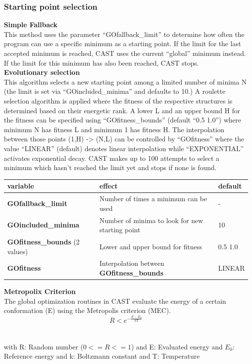 \documentclass[10pt,a4paper]{article} %
\begin{document}
	\subsubsection{Starting point selection}
	\textbf{Simple Fallback} \\
	This method uses the parameter ``GOfallback\_limit'' to determine how often the program can use a specific minimum as a starting point. If the limit for the last accepted minimum is reached, \ac{CAST} uses the current ``global'' minimum instead. If the limit for this minimum has also been reached, \ac{CAST} stops.\\
		
	\textbf{Evolutionary selection} \\
	This algorithm selects a new starting point among a limited number of minima N (the limit is set via ``GOincluded\_minima'' and defaults to 10.)
	A roulette selection algorithm is applied where the fitness of the respective structures is determined based on their energetic rank. A lower L and an upper bound H for the fitness can be specified using ``GOfitness\_bounds'' (default ``0.5 1.0'') where minimum N has fitness L and minimum 1 has fitness H.
	The interpolation between those points (1,H) -> (N,L) can be controlled by ``GOfitness'' where the value ``LINEAR'' (default) denotes linear interpolation while ``EXPONENTIAL'' activates exponential decay.
	\ac{CAST} makes up to 100 attempts to select a minimum which hasn't reached the limit yet and stops if none is found.
	
	\begin{longtable}{|p{3.5cm}|p{5cm}|p{2.5cm}|}
	variable & effect & default \\
		\hline
		\textbf{GOfallback\_limit} & Number of times a minimum can be used & - \\
		\textbf{GOincluded\_minima} & Number of minima to look for new starting point & 10 \\
		\textbf{GOfitness\_bounds} (2 values) & Lower and upper bound for fitness & 0.5 1.0 \\
		\textbf{GOfitness} & Interpolation between \textbf{GOfitness\_bounds} & LINEAR \\
	\end{longtable}

	\textbf{Metropolix Criterion} \\
	The global optimization routines in \ac{CAST} evaluate the energy of a certain conformation (E) using the Metropolis criterion (MEC).
	\begin{equation}
	R < e^{-\frac{E-E_0}{kT}}
	\end{equation}
	\\~\\
	with R: Random number ($0 <= R <= 1$)
	and E: Evaluated energy
	and $E_0$: Reference energy
	and k: Boltzmann constant
	and T: Temperature\\~\\
	
\end{document}
